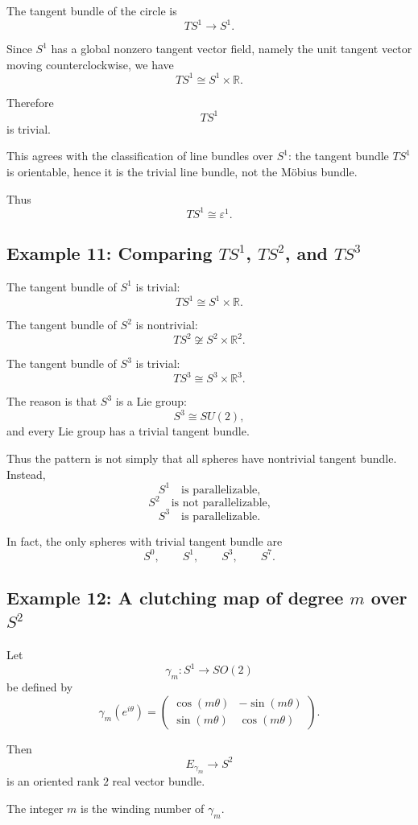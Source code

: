 \documentclass[12pt,a4paper]{article}
\theoremstyle{notespace}
\begin{document}
The tangent bundle of the circle is
\[
TS^1\to S^1.
\]

Since \(S^1\) has a global nonzero tangent vector field, namely the unit tangent vector moving counterclockwise, we have
\[
TS^1\cong S^1\times \mathbb{R}.
\]

Therefore
\[
TS^1
\]
is trivial.

This agrees with the classification of line bundles over \(S^1\): the tangent bundle \(TS^1\) is orientable, hence it is the trivial line bundle, not the M\"obius bundle.

Thus
\[
\boxed{
	TS^1\cong \varepsilon^1.
}
\]

\subsection{Example 11: Comparing \(TS^1\), \(TS^2\), and \(TS^3\)}

The tangent bundle of \(S^1\) is trivial:
\[
TS^1\cong S^1\times \mathbb{R}.
\]

The tangent bundle of \(S^2\) is nontrivial:
\[
TS^2\not\cong S^2\times \mathbb{R}^2.
\]

The tangent bundle of \(S^3\) is trivial:
\[
TS^3\cong S^3\times \mathbb{R}^3.
\]

The reason is that \(S^3\) is a Lie group:
\[
S^3\cong SU(2),
\]
and every Lie group has a trivial tangent bundle.

Thus the pattern is not simply that all spheres have nontrivial tangent bundle. Instead,
\[
S^1
\quad\text{is parallelizable,}
\]
\[
S^2
\quad\text{is not parallelizable,}
\]
\[
S^3
\quad\text{is parallelizable.}
\]

In fact, the only spheres with trivial tangent bundle are
\[
S^0,\qquad S^1,\qquad S^3,\qquad S^7.
\]

\subsection{Example 12: A clutching map of degree \(m\) over \(S^2\)}

Let
\[
\gamma_m:S^1\to SO(2)
\]
be defined by
\[
\gamma_m(e^{i\theta})
=
\begin{pmatrix}
	\cos(m\theta)&-\sin(m\theta)\\
	\sin(m\theta)&\cos(m\theta)
\end{pmatrix}.
\]

Then
\[
E_{\gamma_m}\to S^2
\]
is an oriented rank \(2\) real vector bundle.

The integer \(m\) is the winding number of \(\gamma_m\).
\end{document}
